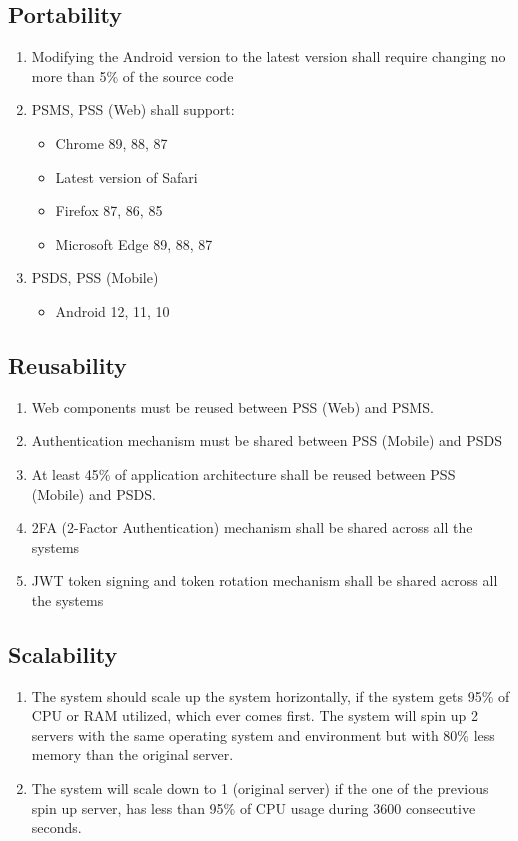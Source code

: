 \subsection{Portability}
\begin{enumerate}[label=POR-\arabic*]
    \item Modifying the Android version to the latest version shall require 
    changing no more than 5\% of the source code
    \item PSMS, PSS (Web) shall support:
    \begin{itemize}
        \item Chrome 89, 88, 87
        \item Latest version of Safari
        \item Firefox 87, 86, 85
        \item Microsoft Edge 89, 88, 87
    \end{itemize}
    \item PSDS, PSS (Mobile)
    \begin{itemize}
        \item Android 12, 11, 10
    \end{itemize}
\end{enumerate}
\pagebreak
\subsection{Reusability}
\begin{enumerate}[label=REU-\arabic*]
    \item Web components must be reused between PSS (Web) and PSMS.
    \item Authentication mechanism must be shared between PSS (Mobile) and PSDS
    \item At least 45\% of application architecture shall be reused 
    between PSS (Mobile) and PSDS.
    \item 2FA (2-Factor Authentication) mechanism shall be shared across 
    all the systems
    \item JWT token signing and token rotation mechanism shall be shared 
    across all the systems
\end{enumerate}

\subsection{Scalability}
\begin{enumerate}[label=SCA-\arabic*]
    \item The system should scale up the system horizontally, if the system 
    gets 95\% of CPU or RAM utilized, which ever comes first. The system will 
    spin up 2 servers with the same operating system and environment 
    but with 80\% less memory than the original server.
    \item The system will scale down to 1 (original server) if the one of the 
    previous spin up server, has less than 95\% of CPU usage during 3600 
    consecutive seconds.
\end{enumerate}

